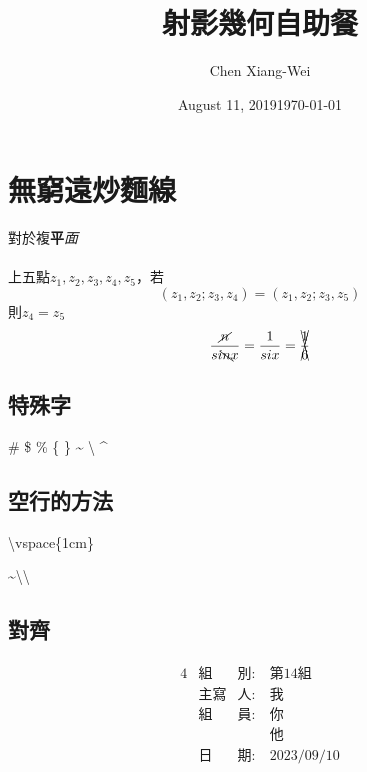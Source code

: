 
\raggedright
\setlength{\parindent}{2em} %
\newpage

\title{射影幾何自助餐} %
\author{Chen Xiang-Wei} %
\date{August 11, 2019}
\date{\today}%
\maketitle
\thispagestyle{fancy}
\raggedright
{}
\tableofcontents  %

\setcounter{section}{-1}

\section{無窮遠炒麵線}
\pro
{\color[RGB]{0,255,200}對於}{\color{blue}複}\textbf{平}\textit{面}
~\\%
~\\%
上五點$z_{1}, z_{2}, z_{3},z_{4},z_{5}$，若\\
\[(z_{1},z_{2};z_{3},z_{4})=(z_{1},z_{2};z_{3},z_5)\]
則$z_{4}=z_{5}$\\


\pro 
$$
\frac{\cancel{n}}{si\bcancel{n} x}=\frac{1}{six}=\xcancel{\frac{1}{6}}
$$

\subsection[short]{特殊字}

\#
\$
\%
\{
\}
\~{}
\textbackslash
\^{}


\subsection{空行的方法}

\textbackslash vspace\{1cm\}
\vspace{1cm}

\~{}\textbackslash\textbackslash
~\\%

\subsection[short]{對齊}
\begin{alignat*}{4}
  &\text{組}&\text{別}:\ &\text{第14組}\\
  &\text{主寫}&\text{人}:\ &\text{我 }\\
  &\text{組}&\text{員}:\ &\text{你 }\\
       &&&\text{他 }\\
  &\text{日}&\text{期}:\ &\text{2023/09/10}\\
\end{alignat*}   


